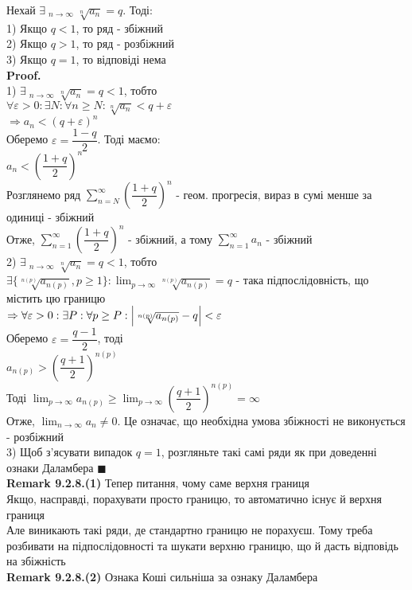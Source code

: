 \documentclass[a4paper, 14pt]{extarticle}
\DeclareMathOperator*\uplim{\overline{lim}}
\def\huge{\displaystyle}
\def\bigline{\vspace{5mm}\\}
\def\rm#1{\textbf{Remark {#1}}}
\def\proof{\textbf{Proof.}\\}
\def\bigline{\vspace{5mm}\\}
\def\qed{$\blacksquare$}
\begin{document}
Нехай $\exists \huge \uplim_{n \to \infty} \sqrt[n]{a_n} = q$. Тоді:\\
1) Якщо $q<1$, то ряд - збіжний\\
2) Якщо $q>1$, то ряд - розбіжний\\
3) Якщо $q=1$, то відповіді нема\\
\proof
1) $\exists \huge \uplim_{n \to \infty} \sqrt[n]{a_n} = q < 1$, тобто\\
$\forall \varepsilon > 0: \exists N: \forall n \geq N: \sqrt[n]{a_n} < q + \varepsilon$\\
$\Rightarrow a_n < (q + \varepsilon)^n$\\
Оберемо $\varepsilon = \dfrac{1-q}{2}$. Тоді маємо:\\
$a_n < \left( \dfrac{1+q}{2} \right)^n$\\
Розглянемо ряд $\huge \sum_{n = N}^{\infty} \left( \dfrac{1+q}{2} \right)^n$ - геом. прогресія, вираз в сумі менше за одиниці - збіжний\\
Отже, $\huge \sum_{n = 1}^{\infty} \left( \dfrac{1+q}{2} \right)^n$ - збіжний, а тому $\huge \sum_{n=1}^{\infty} a_n$ - збіжний
\bigline
2) $\exists \huge \uplim_{n \to \infty} \sqrt[n]{a_n} = q < 1$, тобто\\
$\exists \{\sqrt[n(p)]{a_{n(p)}}, p \geq 1 \}: \huge \lim_{p \to \infty} \sqrt[n(p)]{a_{n(p)}} = q$ - така підпослідовність, що містить цю границю\\
$\Rightarrow \forall \varepsilon > 0: \exists P: \forall p \geq P: \abs{\sqrt[n(p)]{a_{n(p)}} - q} < \varepsilon$\\
Оберемо $\varepsilon = \dfrac{q-1}{2}$, тоді\\
$a_{n(p)} > \left( \dfrac{q+1}{2} \right)^{n(p)}$\\
Тоді $\huge \lim_{p \to \infty} a_{n(p)} \geq \lim_{p \to \infty} \left( \dfrac{q+1}{2} \right)^{n(p)} = \infty$\\
Отже, $\huge \lim_{n \to \infty} a_n \neq 0$. Це означає, що необхідна умова збіжності не виконується - розбіжний
\bigline
3) Щоб з'ясувати випадок $q=1$, розгляньте такі самі ряди як при доведенні ознаки Даламбера \qed
\bigline
\rm{9.2.8.(1)} Тепер питання, чому саме верхня границя\\
Якщо, насправді, порахувати просто границю, то автоматично існує й верхня границя\\
Але виникають такі ряди, де стандартно границю не порахуєш. Тому треба розбивати на підпослідовності та шукати верхню границю, що й дасть відповідь на збіжність
\bigline
\rm{9.2.8.(2)} Ознака Коші сильніша за ознаку Даламбера\\
\end{document}
